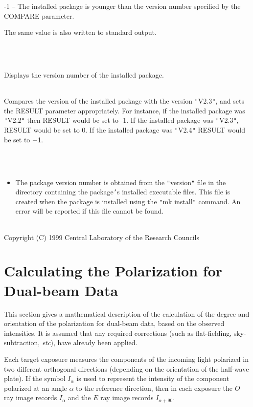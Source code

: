 \documentclass[twoside,11pt]{article}
\newcommand{\stardocinitials}  {SUN}
\newcommand{\stardocnumber}    {223.7}
\newcommand{\stardocname}{\stardocinitials /\stardocnumber}
\newcommand{\xlabel}[1]{}
\renewcommand{\_}{\texttt{\symbol{95}}}
\newlength{\sstexampleslength}
\newcommand{\sstexamples}[1]{
   \item[Examples:] \mbox{} \\
   \vspace{-3.5ex}
   \begin{description}
      #1
   \end{description}
}
\newcommand{\sstexamplesubsection}[2]{\sloppy
\item[\parbox{\sstexampleslength}{\ssttt #1}] \mbox{} \vspace{1.0ex}
\\ #2 }
\newcommand{\sstnotes}[1]{\item[Notes:] \mbox{} \\[1.3ex] #1}
\newcommand{\sstdiytopic}[2]{\item[{\hspace{-0.35em}#1\hspace{-0.35em}:}]
\mbox{} \\[1.3ex] #2}
\newcommand{\sstitemlist}[1]{
  \mbox{} \\
  \vspace{-3.5ex}
  \begin{itemize}
     #1
  \end{itemize}
}
\newcommand{\sstitem}{\item}
\newcommand{\sstexamples}[1]{
      \item[Examples:] \\
      \begin{description}
         #1
      \end{description}
      \\
   }
\newcommand{\sstexamplesubsection}[2]{\item[{\ssttt #1}] #2}
\newcommand{\sstnotes}[1]{\item[Notes:] #1 }
\newcommand{\sstdiytopic}[2]{\item[{#1}] #2 }
\newcommand{\sstitemlist}[1]{
      \begin{itemize}
         #1
      \end{itemize}
      \\
   }
\newcommand{\sstitem}{\item}
\begin{document}
{{{{            \sstitem
            -1 -- The installed package is younger than the version number
            specified by the COMPARE parameter.

         }
         The same value is also written to standard output.
      }
   }
   \sstexamples{
      \sstexamplesubsection{
         polversion
      }{
         Displays the version number of the installed package.
      }
      \sstexamplesubsection{
         polversion compare={\tt "}V2.3{\tt "}
      }{
         Compares the version of the installed package with the version
         {\tt "}V2.3{\tt "}, and sets the RESULT parameter appropriately. For
         instance, if the installed package was {\tt "}V2.2{\tt "} then RESULT
         would be set to -1. If the installed package was {\tt "}V2.3{\tt "},
         RESULT would be set to 0. If the installed package was {\tt "}V2.4{\tt "}
         RESULT would be set to $+$1.
      }
   }
   \sstnotes{
      \sstitemlist{

         \sstitem
         The package version number is obtained from the {\tt "}version{\tt "} file
         in the directory containing the package{\tt '}s installed executable files.
         This file is created when the package is installed using the {\tt "}mk
         install{\tt "} command. An error will be reported if this file cannot be
         found.
      }
   }
   \sstdiytopic{
      Copyright
   }{
      Copyright (C) 1999 Central Laboratory of the Research Councils
   }
}

\newpage
\markboth{\stardocname}{\stardocname}
\section{\label{APP:POL}\xlabel{calculatingthepolarization}Calculating the Polarization for Dual-beam Data}
This section gives a mathematical description of the calculation of the
degree and orientation of the polarization for dual-beam data, based on
the observed intensities. It is assumed that any required corrections
(such as flat-fielding, sky-subtraction, \emph{etc}), have already been
applied.

Each target exposure measures the components of the incoming light
polarized in two different orthogonal directions (depending on the
orientation of the half-wave plate). If the symbol $I_{\alpha}$ is used
to represent the intensity of the component polarized at an angle
$\alpha$ to the reference direction, then in each exposure the $O$ ray
image records $I_{\alpha}$ and the $E$ ray image records $I_{\alpha+90}$.
\end{document}
